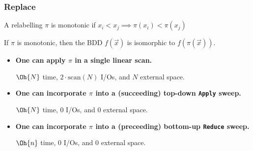 \documentclass[english, aspectratio=169]{beamer}
\newcommand{\scan}[1]{\text{scan}(#1)}
\begin{document}
\begin{frame}
  \begin{center}
  \end{center}
\end{frame}

\begin{frame}
  \frametitle{Replace}

  \begin{definition}
    A relabelling $\pi$ is monotonic if $x_i < x_j \implies \pi(x_i) < \pi(x_j)$
  \end{definition}

  \begin{lemma}
    If $\pi$ is monotonic, then the BDD $f(\vec{x})$ is isomorphic to $f(\pi(\vec{x}))$.
  \end{lemma}

  \medskip

  \begin{itemize}
  \item<2-> {\bf One can apply $\pi$ in a single linear scan.}

    $\Oh{N}$ time, $2 \cdot \scan{N}$ I/Os, and $N$ external space.

  \item<3-> {\bf One can incorporate $\pi$ into a (succeeding) top-down \texttt{Apply} sweep.}

    $\Oh{N}$ time, $0$ I/Os, and $0$ external space.

  \item<3-> {\bf One can incorporate $\pi$ into a (preceeding) bottom-up \texttt{Reduce} sweep.}

    $\Oh{n}$ time, $0$ I/Os, and $0$ external space.
  \end{itemize}
\end{frame}
\end{document}
